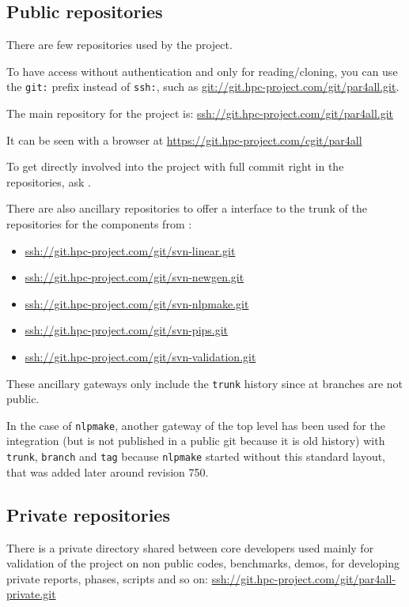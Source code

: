 \documentclass[a4paper]{article}
\begin{document}
\subsection{Public repositories}
\label{sec:public-repositories}

There are few \Agit repositories used by the project.

To have access without authentication and only for reading/cloning, you
can use the \texttt{git:} prefix instead of \texttt{ssh:}, such as
\url{git://git.hpc-project.com/git/par4all.git}.

The main repository for the project is:
\url{ssh://git.hpc-project.com/git/par4all.git}

It can be seen with a \Awww browser at
\url{https://git.hpc-project.com/cgit/par4all}

To get directly involved into the project with full commit right in the
repositories, ask \Ahpcp.

There are also ancillary \Agit repositories to offer a \Agit interface to
the trunk of the \Asvn repositories for the \Apips components from \Acri:
\begin{itemize}
\item \url{ssh://git.hpc-project.com/git/svn-linear.git}
\item \url{ssh://git.hpc-project.com/git/svn-newgen.git}
\item \url{ssh://git.hpc-project.com/git/svn-nlpmake.git}
\item \url{ssh://git.hpc-project.com/git/svn-pips.git}
\item \url{ssh://git.hpc-project.com/git/svn-validation.git}
\end{itemize}
These ancillary gateways only include the \texttt{trunk} history since at
\Acri branches are not public.

In the case of \texttt{nlpmake}, another \Agit{} \Asvn gateway of the top
level has been used for the integration (but is not published in a public
git because it is old history) with \texttt{trunk}, \texttt{branch} and
\texttt{tag} because \texttt{nlpmake} started without this standard
layout, that was added later around revision 750.


\subsection{Private repositories}
\label{sec:private-repositories}

There is a private directory shared between core developers used mainly
for validation of the project on non public codes, benchmarks, demos, for
developing private reports, phases, scripts and so on:
\url{ssh://git.hpc-project.com/git/par4all-private.git}
\end{document}
